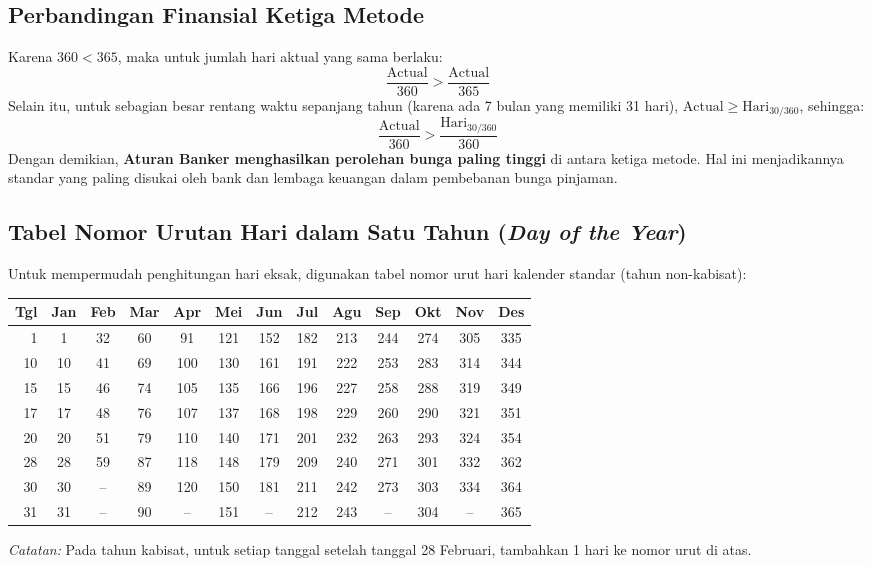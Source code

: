 \documentclass[11pt,a4paper]{article}
\begin{document}
\subsection{Perbandingan Finansial Ketiga Metode}

\begin{notebox}
Karena $360 < 365$, maka untuk jumlah hari aktual yang sama berlaku:
\begin{equation}
    \frac{\text{Actual}}{360} > \frac{\text{Actual}}{365}
\end{equation}
Selain itu, untuk sebagian besar rentang waktu sepanjang tahun (karena ada 7 bulan yang memiliki 31 hari), $\text{Actual} \ge \text{Hari}_{30/360}$, sehingga:
\begin{equation}
    \frac{\text{Actual}}{360} > \frac{\text{Hari}_{30/360}}{360}
\end{equation}
Dengan demikian, \textbf{Aturan Banker menghasilkan perolehan bunga paling tinggi} di antara ketiga metode. Hal ini menjadikannya standar yang paling disukai oleh bank dan lembaga keuangan dalam pembebanan bunga pinjaman.
\end{notebox}

\subsection{Tabel Nomor Urutan Hari dalam Satu Tahun (\textit{Day of the Year})}

Untuk mempermudah penghitungan hari eksak, digunakan tabel nomor urut hari kalender standar (tahun non-kabisat):

\begin{center}
\footnotesize
\setlength{\tabcolsep}{4.2pt}
\renewcommand{\arraystretch}{1.15}
\begin{tabular}{rcccccccccccc}
\toprule
\textbf{Tgl} & \textbf{Jan} & \textbf{Feb} & \textbf{Mar} & \textbf{Apr} & \textbf{Mei} & \textbf{Jun} & \textbf{Jul} & \textbf{Agu} & \textbf{Sep} & \textbf{Okt} & \textbf{Nov} & \textbf{Des} \\
\midrule
1 & 1 & 32 & 60 & 91 & 121 & 152 & 182 & 213 & 244 & 274 & 305 & 335 \\
10 & 10 & 41 & 69 & 100 & 130 & 161 & 191 & 222 & 253 & 283 & 314 & 344 \\
15 & 15 & 46 & 74 & 105 & 135 & 166 & 196 & 227 & 258 & 288 & 319 & 349 \\
17 & 17 & 48 & 76 & 107 & 137 & 168 & 198 & 229 & 260 & 290 & 321 & 351 \\
20 & 20 & 51 & 79 & 110 & 140 & 171 & 201 & 232 & 263 & 293 & 324 & 354 \\
28 & 28 & 59 & 87 & 118 & 148 & 179 & 209 & 240 & 271 & 301 & 332 & 362 \\
30 & 30 & -- & 89 & 120 & 150 & 181 & 211 & 242 & 273 & 303 & 334 & 364 \\
31 & 31 & -- & 90 & -- & 151 & -- & 212 & 243 & -- & 304 & -- & 365 \\
\bottomrule
\end{tabular}
\end{center}
\textit{Catatan:} Pada tahun kabisat, untuk setiap tanggal setelah tanggal 28 Februari, tambahkan 1 hari ke nomor urut di atas.
\end{document}
